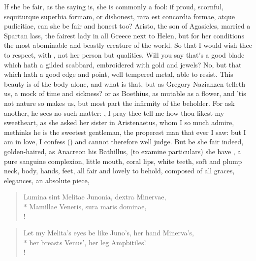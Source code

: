 If she be fair, as the saying is, she is commonly a fool: if proud,
scornful, sequiturque superbia formam, or dishonest, rara est concordia
formae, atque pudicitiae, can she be fair and honest too? 
Aristo, the son of Agasicles, married a Spartan lass, the fairest lady
in all Greece next to Helen, but for her conditions the most abominable
and beastly creature of the world. So that I would wish thee to
respect, with \Seneca{}, not her person but qualities. Will you say
that's a good blade which hath a gilded scabbard, embroidered with gold
and jewels? No, but that which hath a good edge and point, well
tempered metal, able to resist. This beauty is of the body alone, and
what is that, but as  Gregory Nazianzen telleth us, a mock of
time and sickness? or as Boethius, as mutable as a flower, and
'tis not nature so makes us, but most part the infirmity of the
beholder. For ask another, he sees no such matter: , I pray thee tell me how thou likest my sweetheart,
as she asked her sister in Aristenaetus, whom I so much admire,
methinks he is the sweetest gentleman, the properest man that ever I
saw: but I am in love, I confess () and cannot
therefore well judge. But be she fair indeed, golden-haired, as
Anacreon his Bathillus, (to examine particulars) she have , a
pure sanguine complexion, little mouth, coral lips, white teeth, soft and plump
neck, body, hands, feet, all fair and lovely to behold, composed of all graces,
elegances, an absolute piece,
%
\begin{latin}%
\begin{verse}%
Lumina sint Melitae Junonia, dextra Minervae,\\*
Mamillae Veneris, sura maris dominae,\\!
\end{verse}%
\end{latin}%
\translationrule%
\begin{verse}%
Let my Melita's eyes be like Juno's, her hand Minerva's,\\*
her breasts Venus', her leg Ampbitiles'.\\!
\end{verse}%
%


